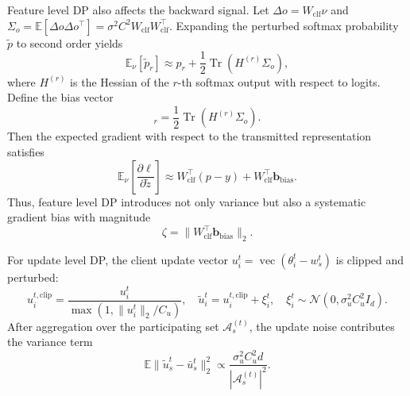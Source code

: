 ﻿\documentclass[preprint,12pt]{elsarticle}
\theoremstyle{plain}
\theoremstyle{definition}
\theoremstyle{remark}
\begin{document}
Feature level DP also affects the backward signal.
Let \(\Delta o=W_{\mathrm{clf}}\nu\) and \(\Sigma_o=\mathbb{E}[\Delta o\Delta o^\top]=\sigma^2C^2W_{\mathrm{clf}}W_{\mathrm{clf}}^\top\).
Expanding the perturbed softmax probability \(\tilde{p}\) to second order yields
\begin{equation}
\mathbb{E}_{\nu}[\tilde{p}_r]
\approx
p_r+\frac{1}{2}\operatorname{Tr}(H^{(r)}\Sigma_o),
\end{equation}
where \(H^{(r)}\) is the Hessian of the \(r\)-th softmax output with respect to logits.
Define the bias vector
\begin{equation}
    [\mathbf{b}_{\mathrm{bias}}]_r
    =
    \frac{1}{2}\operatorname{Tr}(H^{(r)}\Sigma_o).
\end{equation}
Then the expected gradient with respect to the transmitted representation satisfies
\begin{equation}
\mathbb{E}_{\nu}\left[\frac{\partial\ell}{\partial \tilde{z}}\right]
\approx
W_{\mathrm{clf}}^\top(p-y)
+W_{\mathrm{clf}}^\top\mathbf{b}_{\mathrm{bias}}.
\label{eq:feature_dp_bias}
\end{equation}
Thus, feature level DP introduces not only variance but also a systematic gradient bias with magnitude
\begin{equation}
    \zeta=\|W_{\mathrm{clf}}^\top\mathbf{b}_{\mathrm{bias}}\|_2 .
\label{eq:zeta_bias}
\end{equation}

For update level DP, the client update vector
\(u_i^t=\operatorname{vec}(\theta_i^t-w_s^t)\) is clipped and perturbed:
\begin{equation}
    u_i^{t,\mathrm{clip}}
    =
    \frac{u_i^t}{\max(1,\|u_i^t\|_2/C_u)},
    \quad
    \tilde{u}_i^t=u_i^{t,\mathrm{clip}}+\xi_i^t,
    \quad
    \xi_i^t\sim\mathcal{N}(0,\sigma_u^2C_u^2I_d).
\label{eq:update_dp_noise}
\end{equation}
After aggregation over the participating set \(\mathcal{A}_s^{(t)}\), the update noise contributes the variance term
\begin{equation}
    \mathbb{E}\|\tilde{u}_s^t-\bar{u}_s^t\|_2^2
    \propto
    \frac{\sigma_u^2C_u^2d}{|\mathcal{A}_s^{(t)}|^2}.
\label{eq:update_dp_variance}
\end{equation}
\end{document}
